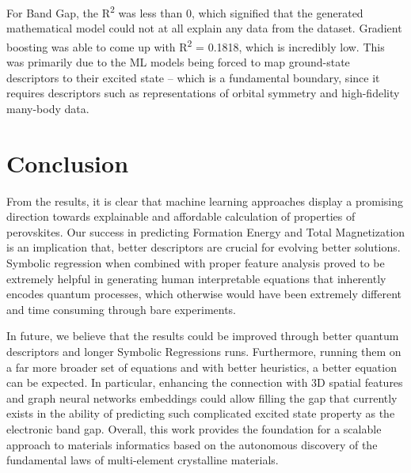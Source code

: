 \documentclass[12pt,onecolumn]{elsarticle}
\begin{document}
For Band Gap, the R\textsuperscript{2} was less than 0, which signified that the generated mathematical model could not at all explain any data from the dataset. Gradient boosting was able to come up with R\textsuperscript{2} = 0.1818, which is incredibly low. This was primarily due to the ML models being forced to map ground-state descriptors to their excited state -- which is a fundamental boundary, since it requires descriptors such as representations of orbital symmetry and high-fidelity many-body data.

\section{Conclusion}
From the results, it is clear that machine learning approaches display a promising direction towards explainable and affordable calculation of properties of perovskites. Our success in predicting Formation Energy and Total Magnetization is an implication that, better descriptors are crucial for evolving better solutions. Symbolic regression when combined with proper feature analysis proved to be extremely helpful in generating human interpretable equations that inherently encodes quantum processes, which otherwise would have been extremely different and time consuming through bare experiments.

In future, we believe that the results could be improved through better quantum descriptors and longer Symbolic Regressions runs. Furthermore, running them on a far more broader set of equations and with better heuristics, a better equation can be expected. In particular, enhancing the connection with 3D spatial features and graph neural networks embeddings could allow filling the gap that currently exists in the ability of predicting such complicated excited state property as the electronic band gap. Overall, this work provides the foundation for a scalable approach to materials informatics based on the autonomous discovery of the fundamental laws of multi-element crystalline materials.
\end{document}
